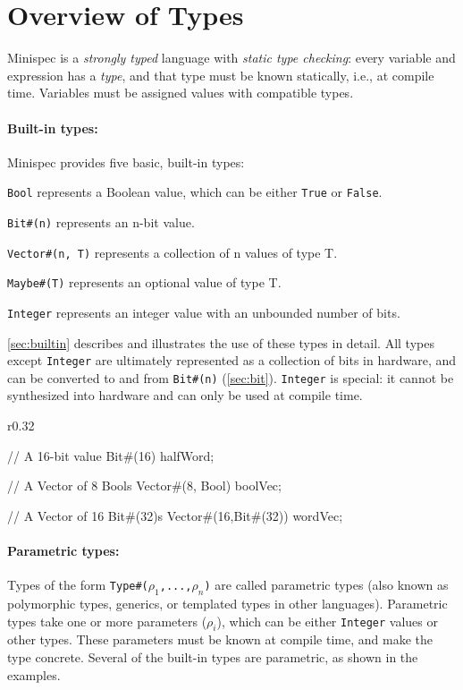 \section{Overview of Types}
\label{sec:types}

Minispec is a \emph{strongly typed} language with \emph{static type checking}:
every variable and expression has a \emph{type},
and that type must be known statically, i.e., at compile time.
Variables must be assigned values with compatible types.

\paragraph{Built-in types:} Minispec provides five basic, built-in types:
\begin{compactitem}
\item \texttt{Bool} represents a Boolean value, which can be either \texttt{True} or \texttt{False}.
\item \texttt{Bit\#(n)} represents an n-bit value.
\item \texttt{Vector\#(n, T)} represents a collection of n values of type T.
\item \texttt{Maybe\#(T)} represents an optional value of type T.
\item \texttt{Integer} represents an integer value with an unbounded number of bits.
\end{compactitem}
\autoref{sec:builtin} describes and illustrates the use of these types in detail.
All types except \texttt{Integer} are ultimately represented as a collection of bits in hardware,
and can be converted to and from \texttt{Bit\#(n)} (\autoref{sec:bit}).
\texttt{Integer} is special: it cannot be synthesized into hardware
and can only be used at compile time.

\begin{wrapfigure}{r}{0.32\columnwidth}
\vspace{-2.8em}
\begin{mscode}
// A 16-bit value
Bit#(16) halfWord;

// A Vector of 8 Bools
Vector#(8, Bool) boolVec;

// A Vector of 16 Bit#(32)s
Vector#(16,Bit#(32)) wordVec;
\end{mscode}
\vspace{-2em}
\end{wrapfigure}

\paragraph{Parametric types:} Types of the form \texttt{Type\#($\rho_1$,...,$\rho_n$)} are called parametric types
(also known as polymorphic types, generics, or templated types in other languages).
Parametric types take one or more parameters ($\rho_i$), which can be either \texttt{Integer} values or other types.
These parameters must be known at compile time, and make the type concrete.
Several of the built-in types are parametric, as shown in the examples.


